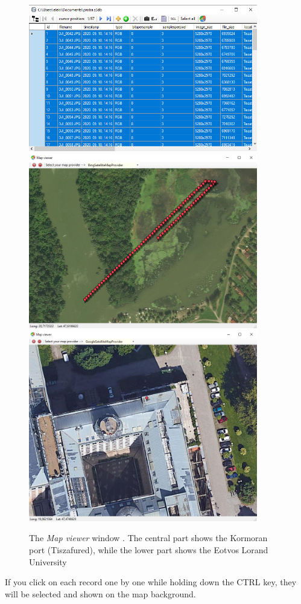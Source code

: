\documentclass[a4paper,12pt]{article}
\begin{document}
\begin{itemize}
\begin{figure}
	\centering
	\includegraphics[width=10cm]{mapviewer_select_all.png}
	\includegraphics[width=10cm]{mapviewer.png}
	\includegraphics[width=10cm]{tegeta.png}		
	\caption{The \textit{Map viewer} window . The central part shows the Kormoran port (Tiszafured), while the lower part shows the Eotvos Lorand University }
	\label{fig:mapviewer}
\end{figure}
	
	If you click on each record one by one while holding down the CTRL key, they will be selected and shown on the map background. 
	
	
	
\end{itemize}
\end{document}
